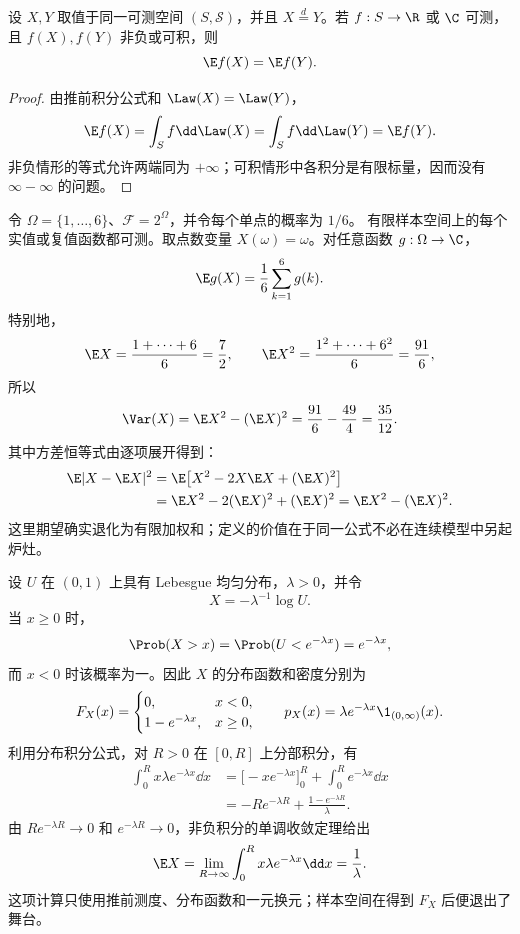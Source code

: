 \begin{proposition}[期望的分布不变性]\label{proposition:5-1-1-1}
设 $X,Y$ 取值于同一可测空间 $(S,\mathcal S)$，并且 $X\overset{d}=Y$。若
$f:S\to\R$ 或 $\C$ 可测，且 $f(X),f(Y)$ 非负或可积，则
\[
  \E f(X)=\E f(Y).
\]
\end{proposition}

\begin{proof}
由推前积分公式和 $\Law(X)=\Law(Y)$，
\[
 \E f(X)=\int_S f\dd\Law(X)
 =\int_S f\dd\Law(Y)=\E f(Y).
\]
非负情形的等式允许两端同为 $+\infty$；可积情形中各积分是有限标量，因而没有
$\infty-\infty$ 的问题。
\end{proof}

\begin{example}[有限样本空间]\label{ex:5-1-1-1}
令 $\Omega=\{1,\ldots,6\}$、$\mathcal F=2^\Omega$，并令每个单点的概率为 $1/6$。
有限样本空间上的每个实值或复值函数都可测。取点数变量 $X(\omega)=\omega$。对任意函数
$g:\Omega\to\C$，
\[
 \E g(X)=\frac16\sum_{k=1}^6g(k).
\]
特别地，
\[
 \E X=\frac{1+\cdots+6}{6}=\frac72,
 \qquad
 \E X^2=\frac{1^2+\cdots+6^2}{6}=\frac{91}{6},
\]
所以
\[
 \Var(X)=\E X^2-(\E X)^2
 =\frac{91}{6}-\frac{49}{4}=\frac{35}{12}.
\]
其中方差恒等式由逐项展开得到：
\begin{align*}
 \E|X-\E X|^2
 &=\E\bigl[X^2-2X\E X+(\E X)^2\bigr]\\
 &=\E X^2-2(\E X)^2+(\E X)^2
 =\E X^2-(\E X)^2.
\end{align*}
这里期望确实退化为有限加权和；定义的价值在于同一公式不必在连续模型中另起炉灶。
\end{example}

\begin{example}[均匀变量生成指数变量]\label{ex:5-1-1-2}
设 $U$ 在 $(0,1)$ 上具有 Lebesgue 均匀分布，$\lambda>0$，并令
\[
 X=-\lambda^{-1}\log U.
\]
当 $x\ge0$ 时，
\[
 \Prob(X>x)=\Prob(U<e^{-\lambda x})=e^{-\lambda x},
\]
而 $x<0$ 时该概率为一。因此 $X$ 的分布函数和密度分别为
\[
 F_X(x)=
 \begin{cases}0,&x<0,\\1-e^{-\lambda x},&x\ge0,\end{cases}
 \qquad
 p_X(x)=\lambda e^{-\lambda x}\1_{(0,\infty)}(x).
\]
利用分布积分公式，对 $R>0$ 在 $[0,R]$ 上分部积分，有
\begin{align*}
 \int_0^R x\lambda e^{-\lambda x}\dd x
 &=\bigl[-xe^{-\lambda x}\bigr]_{0}^{R}
   +\int_0^R e^{-\lambda x}\dd x\\
 &=-Re^{-\lambda R}+\frac{1-e^{-\lambda R}}{\lambda}.
\end{align*}
由 $Re^{-\lambda R}\to0$ 和 $e^{-\lambda R}\to0$，非负积分的单调收敛定理给出
\[
 \E X=\lim_{R\to\infty}\int_0^R x\lambda e^{-\lambda x}\dd x=\frac1\lambda.
\]
这项计算只使用推前测度、分布函数和一元换元；样本空间在得到 $F_X$ 后便退出了舞台。
\end{example}

